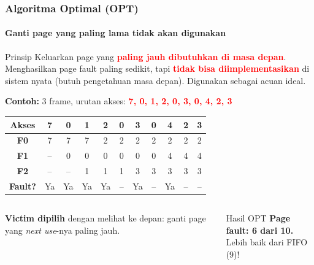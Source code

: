 \documentclass[t,aspectratio=169,xcolor=dvipsnames]{beamer}
\newcommand{\tem}[1]{\textbf{\textcolor{red}{#1}}}
\begin{document}
\begin{frame}
    \frametitle{Algoritma Optimal (OPT)}
    \framesubtitle{Ganti page yang paling lama tidak akan digunakan}
    \scriptsize

    \begin{block}{Prinsip}
        Keluarkan page yang \tem{paling jauh dibutuhkan di masa depan}. Menghasilkan page fault paling sedikit, tapi \tem{tidak bisa diimplementasikan} di sistem nyata (butuh pengetahuan masa depan). Digunakan sebagai acuan ideal.
    \end{block}

    \vspace{0.1cm}
    \textbf{Contoh:} 3 frame, urutan akses: \tem{7, 0, 1, 2, 0, 3, 0, 4, 2, 3}

    \vspace{0.1cm}
\begin{tabular}{|c|c|c|c|c|c|c|c|c|c|c|}
        \hline
        \textbf{Akses} & 7 & 0 & 1 & 2 & 0 & 3 & 0 & 4 & 2 & 3 \\
        \hline
    \textbf{F0} & \cellcolor{green!20}7 & 7 & 7 & \cellcolor{red!20}2 & 2 & 2 & 2 & 2 & 2 & 2 \\
        \hline
    \textbf{F1} & -- & \cellcolor{green!20}0 & 0 & 0 & 0 & 0 & 0 & \cellcolor{red!20}4 & 4 & 4 \\
        \hline
    \textbf{F2} & -- & -- & \cellcolor{green!20}1 & 1 & 1 & \cellcolor{red!20}3 & 3 & 3 & 3 & 3 \\
        \hline
    \textbf{Fault?} & \cellcolor{green!20}Ya & \cellcolor{green!20}Ya & \cellcolor{green!20}Ya & \cellcolor{red!20}Ya & -- & \cellcolor{red!20}Ya & -- & \cellcolor{red!20}Ya & -- & -- \\
        \hline
    \end{tabular}

    \vspace{0.1cm}
    \begin{columns}[T]
        \textbf{Victim dipilih} dengan melihat ke depan: ganti page yang \textit{next use}-nya paling jauh.

        \begin{exampleblock}{Hasil OPT}
            \textbf{Page fault: 6 dari 10.}\\
            Lebih baik dari FIFO (9)!
        \end{exampleblock}
    \end{columns}
\end{frame}
\end{document}
